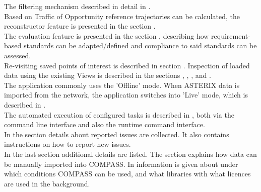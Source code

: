 The filtering mechanism described in detail in . \\

Based on Traffic of Opportunity reference trajectories can be calculated, the reconstructor feature is presented in the section . \\

The evaluation feature is presented in the section , describing how requirement-based standards can be adapted/defined and compliance to said standards can be assessed. \\

Re-visiting saved points of interest is described in section . Inspection of loaded data using the existing Views is described in the sections , , ,  and . \\

The application commonly uses the 'Offline' mode. When ASTERIX data is imported from the network, the application switches into 'Live' mode, which is described in . \\

The automated execution of configured tasks is described in , both via the command line interface and also the runtime command interface. \\

In the section  details about reported issues are collected. It also contains instructions on how to report new issues. \\

In the last section  additional details are listed. 
The section  explains how data can be manually imported into COMPASS. 
In  information is given about under which conditions COMPASS can be used, and what libraries with what licences are used in the background.

\pagebreak










